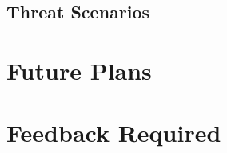 \documentclass[11pt, a4paper, twoside, notitlepage]{article}
\begin{document}
\subsection*{Threat Scenarios}





\section{Future Plans}





\section{Feedback Required}






\backmatter



\end{document}
